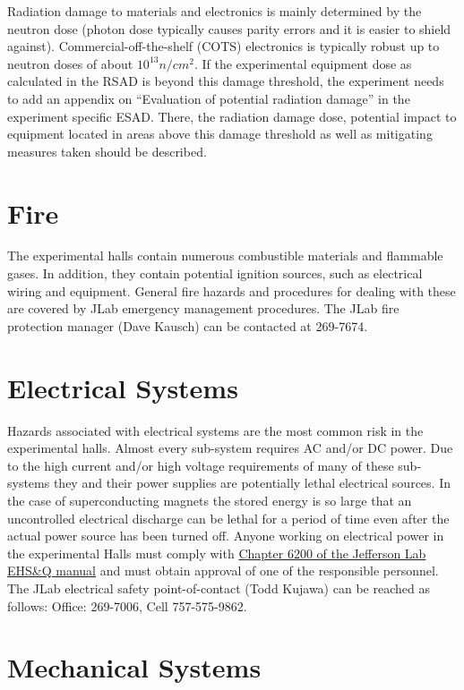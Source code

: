 Radiation damage to materials and electronics is mainly determined by the neutron 
dose (photon dose typically causes parity errors and it is easier to shield against). 
Commercial-off-the-shelf (COTS) electronics is typically robust up to neutron 
doses of about $10^{13} n/cm^2$. If the experimental equipment dose as calculated 
in the RSAD is beyond this damage threshold, the experiment needs to add 
an appendix on ``Evaluation of potential radiation damage'' in the experiment 
specific ESAD. There, the radiation damage dose, potential impact to equipment 
located in areas above this damage threshold as well as mitigating measures taken should be described.

\section{Fire}

	The experimental halls contain numerous combustible materials and flammable gases. 
In addition, they contain potential ignition sources, such as electrical wiring and equipment. 
General fire hazards and procedures for dealing with these are covered by JLab emergency 
management procedures. The JLab fire protection manager (Dave Kausch) can be contacted at 269-7674.

\section{Electrical Systems}

	Hazards associated with electrical systems are the most common risk in the experimental halls. 
Almost every sub-system requires AC and/or DC power. Due to the high current and/or high voltage 
requirements of many of these sub-systems they and their power supplies are potentially lethal 
electrical sources. In the case of superconducting magnets the stored energy is so large that 
an uncontrolled electrical discharge can be lethal for a period of time even after the actual 
power source has been turned off.  Anyone working on electrical power in the experimental Halls 
must comply with \href{http://www.jlab.org/ehs/ehsmanual/manual/6200.html}{Chapter 6200 of the Jefferson Lab EHS\&Q manual}
and must obtain approval of one of the responsible personnel. 
The JLab electrical safety point-of-contact (Todd Kujawa) can be reached as follows: Office: 269-7006,
Cell 757-575-9862.

\section{Mechanical Systems}

